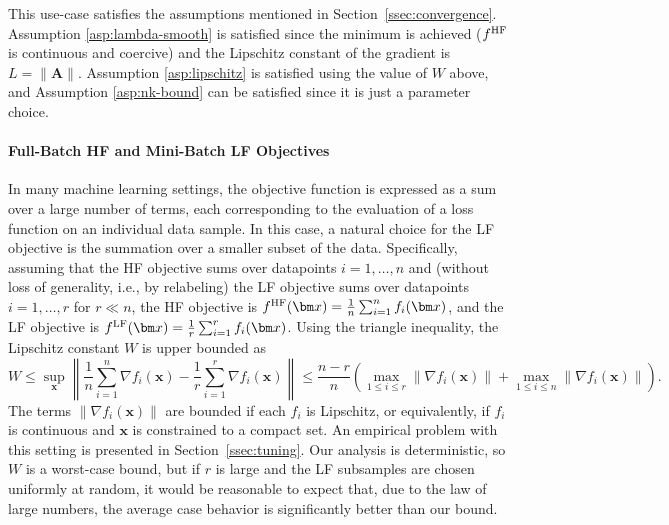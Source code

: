 \documentclass[10pt]{article} %
\numberwithin{equation}{section}
\theoremstyle{plain}
\theoremstyle{definition}
\newcommand{\<}{\langle}
\renewcommand{\>}{\rangle}
\renewcommand{\(}{\left(}
\renewcommand{\)}{\right)}
\renewcommand{\[}{\left[}
\renewcommand{\]}{\right]}
\newcommand{\HF}{\textup{HF}}
\newcommand{\LF}{\textup{LF}}
\begin{document}
This use-case satisfies the assumptions mentioned in Section~\ref{ssec:convergence}. Assumption
\ref{asp:lambda-smooth} is satisfied since the minimum is achieved ($f^\HF$ is continuous and coercive) and the Lipschitz constant of the gradient is $L=\|\bm A\|$. Assumption \ref{asp:lipschitz} is satisfied using the value of $W$ above, and Assumption \ref{asp:nk-bound} can be satisfied since it is just a parameter choice.

\paragraph{Full-Batch HF and Mini-Batch LF Objectives}
In many machine learning settings, the objective function is expressed as a sum over a large number of terms, each corresponding to the evaluation of a loss function on an individual data sample. In this case, a natural choice for the LF objective is the summation over a smaller subset of the data. Specifically, 
assuming that the HF objective sums over datapoints $i=1,\ldots,n$ and (without loss of generality, i.e., by relabeling) the LF objective sums over datapoints $i=1,\ldots,r$ for $r\ll n$, 
the HF objective is $f^\HF(\bm x) = \frac{1}{n}\sum_{i=1}^n f_i(\bm x)$, and the LF objective is $f^\LF(\bm x) = \frac{1}{r}\sum_{i=1}^r f_i(\bm x)$. Using the triangle inequality, the Lipschitz constant $W$ is upper bounded as
\begin{equation}
    W \leq \sup_{\bm x} \left\lVert \frac{1}{n}\sum_{i=1}^n \nabla f_i(\bm x) - \frac{1}{r}\sum_{i=1}^r \nabla f_i(\bm x) \right\rVert \leq \frac{n-r}{n}\left(\max_{1\leq i\leq r} \| \nabla f_i(\bm x)\| + \max_{1\leq i\leq n} \| \nabla f_i(\bm x)\|\right).
\end{equation}
The terms $\| \nabla f_i(\bm x)\|$ are bounded if each $f_i$ is Lipschitz, or equivalently, if $f_i$ is continuous and $\bm x$ is constrained to a compact set.
An empirical problem with this setting is presented in Section~\ref{ssec:tuning}. Our analysis is deterministic, so $W$ is a worst-case bound, but if $r$ is large and the LF subsamples are chosen uniformly at random, it would be reasonable to expect that, due to the law of large numbers, the average case behavior is significantly better than our bound.
\end{document}
